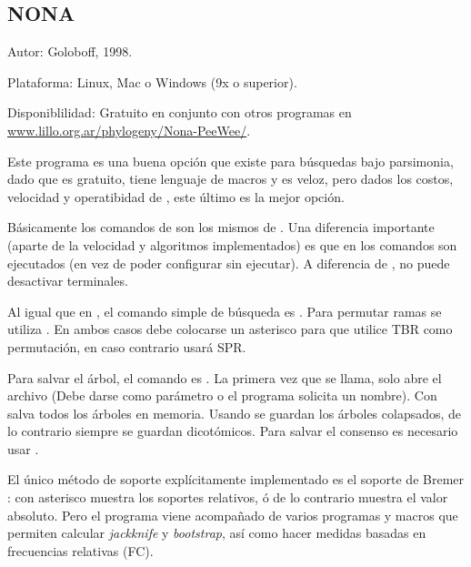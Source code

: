 \subsection{NONA}
\noindent
Autor: Goloboff, 1998.

Plataforma: Linux, Mac o Windows (9x o superior).

Disponiblilidad: Gratuito en conjunto con otros programas en \url{www.lillo.org.ar/phylogeny/Nona-PeeWee/}.


Este programa es una buena opci\'on que existe para b\'usquedas bajo parsimonia, dado que es gratuito, tiene lenguaje de macros y es veloz, pero dados los costos, velocidad y operatibidad de , este \'ultimo es la mejor opci\'on.


B\'asicamente los comandos de  son los mismos de . Una diferencia importante (aparte de la velocidad y algoritmos implementados) es que en  los comandos son ejecutados (en vez de poder configurar sin ejecutar). A diferencia de , no puede desactivar terminales.

Al igual que en , el comando simple de b\'usqueda es . Para permutar ramas se utiliza . En ambos casos debe colocarse un asterisco  para que utilice TBR como permutaci\'on, en caso contrario usar\'a SPR.


Para salvar el \'arbol, el comando es . La primera vez que se llama, solo abre el archivo (Debe darse como par\'ametro o el programa solicita un nombre). Con  salva todos los \'arboles en memoria. Usando  se guardan los \'arboles colapsados, de lo contrario siempre se guardan dicot\'omicos. Para salvar el consenso es necesario usar .

El \'unico m\'etodo de soporte expl\'icitamente implementado es el soporte de Bremer : con asterisco  muestra los soportes relativos, \'o de lo contrario muestra el valor absoluto. Pero el programa viene acompa\~nado de varios programas y macros que permiten calcular \textit{jackknife} y \textit{bootstrap}, as\'i como hacer medidas basadas en frecuencias relativas (FC).